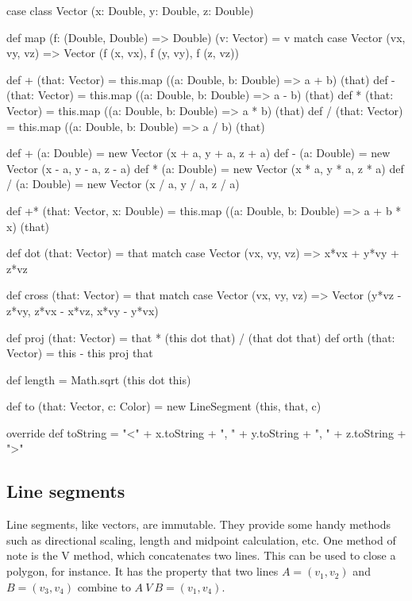 \documentclass{article}
\begin{document}
      \begin{scalacode}
case class Vector (x: Double, y: Double, z: Double) {
  def map (f: (Double, Double) => Double) (v: Vector) = v match {
    case Vector (vx, vy, vz) => Vector (f (x, vx), f (y, vy), f (z, vz))}

  def + (that: Vector) = this.map ((a: Double, b: Double) => a + b) (that)
  def - (that: Vector) = this.map ((a: Double, b: Double) => a - b) (that)
  def * (that: Vector) = this.map ((a: Double, b: Double) => a * b) (that)
  def / (that: Vector) = this.map ((a: Double, b: Double) => a / b) (that)

  def + (a: Double) = new Vector (x + a, y + a, z + a)
  def - (a: Double) = new Vector (x - a, y - a, z - a)
  def * (a: Double) = new Vector (x * a, y * a, z * a)
  def / (a: Double) = new Vector (x / a, y / a, z / a)

  def +* (that: Vector, x: Double) = this.map ((a: Double, b: Double) => a + b * x) (that)

  def dot (that: Vector) = that match {
    case Vector (vx, vy, vz) => x*vx + y*vy + z*vz}

  def cross (that: Vector) = that match {
    case Vector (vx, vy, vz) => Vector (y*vz - z*vy, z*vx - x*vz, x*vy - y*vx)}

  def proj (that: Vector) = that * (this dot that) / (that dot that)
  def orth (that: Vector) = this - this proj that

  def length = Math.sqrt (this dot this)

  def to (that: Vector, c: Color) = new LineSegment (this, that, c)

  override def toString = "<" + x.toString + ", " + y.toString + ", " + z.toString + ">"
}
      \end{scalacode}

    \subsection{Line segments}
      \label{sec:line-segments}

      Line segments, like vectors, are immutable. They provide some handy methods such as directional scaling, length and midpoint calculation, etc. One method
      of note is the V method, which concatenates two lines. This can be used to close a polygon, for instance. It has the property that two lines $A = (v_1,
      v_2)$ and $B = (v_3, v_4)$ combine to $A~V~B = (v_1, v_4)$.
\end{document}
